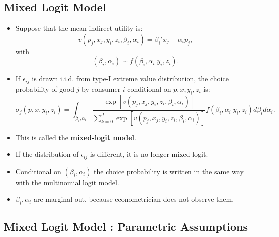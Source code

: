 \documentclass[
]{book}
\providecommand{\tightlist}{%
  \setlength{\itemsep}{0pt}\setlength{\parskip}{0pt}}
\begin{document}
\hypertarget{mixed-logit-model}{%
\subsection{Mixed Logit Model}\label{mixed-logit-model}}

\begin{itemize}
\tightlist
\item
  Suppose that the mean indirect utility is:
  \begin{equation}
  v(p_j, x_j, y_i, z_i, \beta_i, \alpha_i) = \beta_i' x_j - \alpha_i p_j,
  \end{equation}
  with
  \begin{equation}
  (\beta_i, \alpha_i) \sim f(\beta_i, \alpha_i|y_i, z_i).
  \end{equation}
\item
  If \(\epsilon_{ij}\) is drawn i.i.d. from type-I extreme value distribution, the choice probability of good \(j\) by consumer \(i\) conditional on \(p, x, y_i, z_i\) is:
  \begin{equation}
  \sigma_{j}(p, x, y_i, z_i) = \int_{\beta_i, \alpha_i} \frac{\exp[v(p_j, x_j, y_i, z_i, \beta_i, \alpha_i)]}{\sum_{k = 0}^J \exp[v(p_j, x_j, y_i, z_i, \beta_i, \alpha_i)]} f(\beta_i, \alpha_i|y_i, z_i) d\beta_i d\alpha_i.
  \end{equation}
\item
  This is called the \textbf{mixed-logit model}.
\item
  If the distribution of \(\epsilon_{ij}\) is different, it is no longer mixed logit.
\item
  Conditional on \((\beta_i, \alpha_i)\) the choice probability is written in the same way with the multinomial logit model.
\item
  \(\beta_i, \alpha_i\) are marginal out, because econometrician does not observe them.
\end{itemize}

\hypertarget{mixed-logit-model-parametric-assumptions}{%
\subsection{Mixed Logit Model : Parametric Assumptions}\label{mixed-logit-model-parametric-assumptions}}
\end{document}
